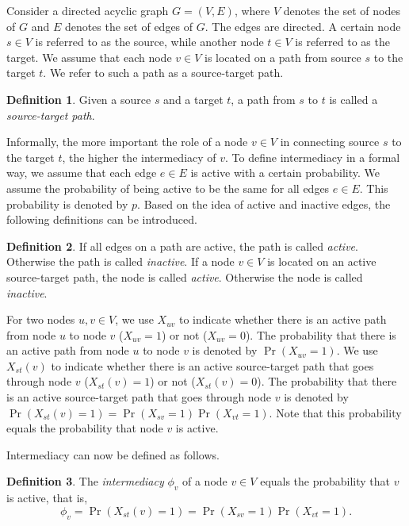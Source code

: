 \documentclass[9pt,twocolumn,twoside,lineno]{pnas-alt}
\theoremstyle{definition}
\newtheorem{definition}{Definition}
\begin{document}
Consider a directed acyclic graph $G = (V, E)$, where $V$ denotes the set of nodes of $G$ and $E$ denotes the set of edges of $G$. The edges are directed. A certain node $s \in V$ is referred to as the source, while another node $t \in V$ is referred to as the target. We assume that each node $v \in V$ is located on a path from source $s$ to the target $t$. We refer to such a path as a source-target path.

\begin{definition}
    Given a source $s$ and a target $t$, a path from $s$ to $t$ is called a \emph{source-target path}.
\end{definition}

Informally, the more important the role of a node $v \in V$ in connecting source $s$ to the target $t$, the higher the intermediacy of $v$. To define intermediacy in a formal way, we assume that each edge $e \in E$ is active with a certain probability. We assume the probability of being active to be the same for all edges $e \in E$. This probability is denoted by $p$. Based on the idea of active and inactive edges, the following definitions can be introduced.

\begin{definition}
    If all edges on a path are active, the path is called \emph{active}. Otherwise the path is called \emph{inactive}. If a node $v \in V$ is located on an active source-target path, the node is called \emph{active}. Otherwise the node is called \emph{inactive}.
\end{definition}

For two nodes $u, v \in V$, we use $X_{uv}$ to indicate whether there is an active path from node $u$ to node $v$ ($X_{uv} = 1$) or not ($X_{uv} = 0$). The probability that there is an active path from node $u$ to node $v$ is denoted by $\Pr(X_{uv} = 1)$. We use $X_{st}(v)$ to indicate whether there is an active source-target path that goes through node $v$ ($X_{st}(v) = 1$) or not ($X_{st}(v) = 0$). The probability that there is an active source-target path that goes through node $v$ is denoted by $\Pr(X_{st}(v) = 1) = \Pr(X_{sv} = 1)\Pr(X_{vt} = 1)$. Note that this probability equals the probability that node $v$ is active.

Intermediacy can now be defined as follows.

\begin{definition}
    The \emph{intermediacy} $\phi_v$ of a node $v \in V$ equals the probability that $v$ is active, that is,
    \begin{equation}
        \phi_v = \Pr(X_{st}(v) = 1) = \Pr(X_{sv} = 1)\Pr(X_{vt} = 1).
        \label{eq:decom}
    \end{equation}
\end{definition}
\end{document}

